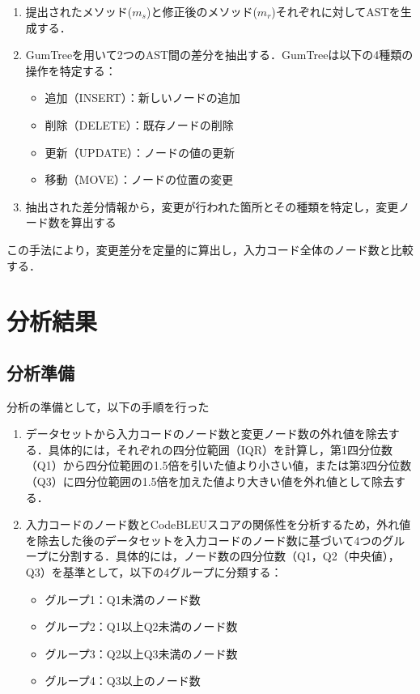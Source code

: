 \documentclass[11pt]{jreport}
\begin{document}
\begin{enumerate}
\item 提出されたメソッド($m_s$)と修正後のメソッド($m_r$)それぞれに対してASTを生成する．
\item GumTreeを用いて2つのAST間の差分を抽出する．GumTreeは以下の4種類の操作を特定する：
\begin{itemize}
\item 追加（INSERT）：新しいノードの追加
\item 削除（DELETE）：既存ノードの削除
\item 更新（UPDATE）：ノードの値の更新
\item 移動（MOVE）：ノードの位置の変更
\end{itemize}
\item 抽出された差分情報から，変更が行われた箇所とその種類を特定し，変更ノード数を算出する
\end{enumerate}
この手法により，変更差分を定量的に算出し，入力コード全体のノード数と比較する．

\section{分析結果}

\subsection {分析準備}

分析の準備として，以下の手順を行った

\begin{enumerate}
   \item データセットから入力コードのノード数と変更ノード数の外れ値を除去する．具体的には，それぞれの四分位範囲（IQR）を計算し，第1四分位数（Q1）から四分位範囲の1.5倍を引いた値より小さい値，または第3四分位数（Q3）に四分位範囲の1.5倍を加えた値より大きい値を外れ値として除去する．

   \item 入力コードのノード数とCodeBLEUスコアの関係性を分析するため，外れ値を除去した後のデータセットを入力コードのノード数に基づいて4つのグループに分割する．具体的には，ノード数の四分位数（Q1，Q2（中央値），Q3）を基準として，以下の4グループに分類する：
   \begin{itemize}
       \item グループ1：Q1未満のノード数
       \item グループ2：Q1以上Q2未満のノード数
       \item グループ3：Q2以上Q3未満のノード数
       \item グループ4：Q3以上のノード数
   \end{itemize}
\end{enumerate}
\end{document}
